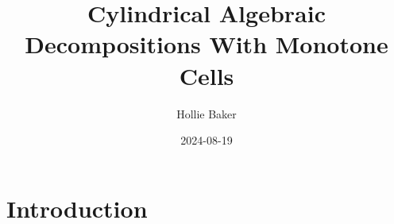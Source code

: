 \documentclass[
]{book}
\title{Cylindrical Algebraic Decompositions With Monotone Cells}
\author{Hollie Baker}
\date{2024-08-19}
\theoremstyle{definition}
\theoremstyle{definition}
\theoremstyle{definition}
\theoremstyle{definition}
\theoremstyle{remark}
\begin{document}
\maketitle

{
\setcounter{tocdepth}{1}
\tableofcontents
}
\hypertarget{intro}{%
\chapter{Introduction}\label{intro}}

\newcommand{\R}{\mathbb{R}}
\newcommand{\Q}{\mathbb{Q}}
\newcommand{\N}{\mathbb{N}}
\newcommand{\Z}{\mathbb{Z}}
\newcommand{\A}{\mathbb{A}}

\newcommand{\sign}{\operatorname{sign}}
\newcommand{\proj}{\operatorname{proj}}
\newcommand{\lcm}{\operatorname{lcm}}
\newcommand{\lc}{\operatorname{lc}}
\newcommand{\lm}{\operatorname{lm}}
\newcommand{\ldt}{\operatorname{lt}}
\newcommand{\multideg}{\operatorname{multideg}}
\newcommand{\red}{\operatorname{red}}
\newcommand{\prim}{\operatorname{prim}}
\newcommand{\psrc}{\operatorname{psrc}}
\newcommand{\res}{\operatorname{Res}}
\newcommand{\lex}{<_{\rm{lex}}}
\newcommand{\lexeq}{\le_{\rm{lex}}}
\newcommand{\projop}[1]{{\proj_{\R^{#1}}}}

\newcommand{\projops}[1]{{\proj_{\opspan{#1}}}}
\newcommand{\opspan}[1]{{\operatorname{span} \{#1\}}}
\newcommand{\fr}[1]{{\operatorname{fr} \left( #1 \right)}}
\newcommand{\cl}[1]{{\operatorname{cl} \left( #1 \right)}}

\newcommand{\frt}{{\rm{fr}}}
\newcommand{\cls}{{\rm{cl}}}
\end{document}
